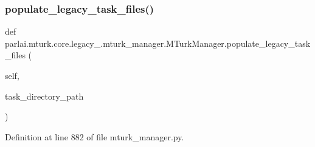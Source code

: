 \subsubsection{\texorpdfstring{populate\+\_\+legacy\+\_\+task\+\_\+files()}{populate\_legacy\_task\_files()}}
{\footnotesize\ttfamily def parlai.\+mturk.\+core.\+legacy\+\_.\+mturk\+\_\+manager.\+M\+Turk\+Manager.\+populate\+\_\+legacy\+\_\+task\+\_\+files (\begin{DoxyParamCaption}\item[{}]{self,  }\item[{}]{task\+\_\+directory\+\_\+path }\end{DoxyParamCaption})}



Definition at line 882 of file mturk\+\_\+manager.\+py.


